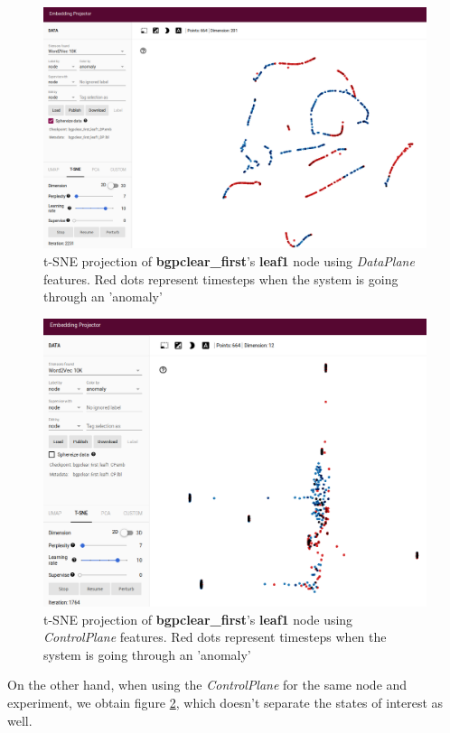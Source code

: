 \begin{figure}[h!]
	\centering
	\includegraphics[width=0.8\linewidth]{Figure/bgpclear_first_leaf1_DP.png}
	\caption{t-SNE projection of \textbf{bgpclear\_first}'s \textbf{leaf1} node using \textit{DataPlane} features. Red dots represent timesteps when the system is going through an 'anomaly'}
	\label{fig:bgpclear_first_leaf1_DP}
\end{figure}
\begin{figure}[h!]
	\centering
	\includegraphics[width=0.8\linewidth]{Figure/bgpclear_first_leaf1_CP.png}
	\caption{t-SNE projection of \textbf{bgpclear\_first}'s \textbf{leaf1} node using \textit{ControlPlane} features. Red dots represent timesteps when the system is going through an 'anomaly'}
	\label{fig:bgpclear_first_leaf1_CP}
\end{figure}

On the other hand, when using the \textit{ControlPlane} for the same node and experiment, we obtain figure \ref{fig:bgpclear_first_leaf1_CP}, which doesn't separate the states of interest as well.

